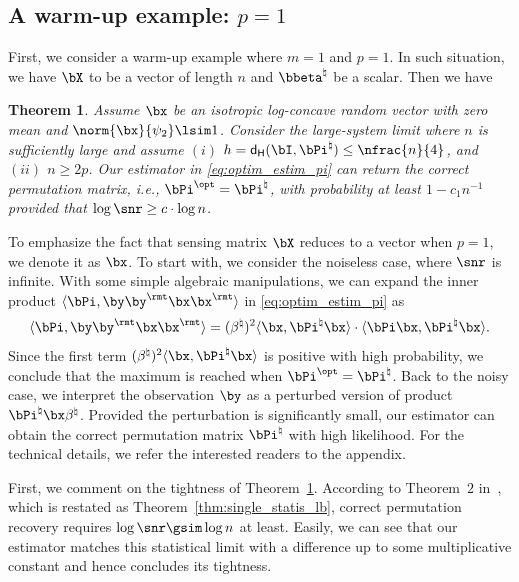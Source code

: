 \documentclass[11pt]{article}
\newtheorem{theorem}{Theorem}
\newenvironment{proofoutline}
 {\renewcommand\qedsymbol{}\proof[Proof outline]}
 {\endproof}
\def \dH {\mathsf{d_H}}
\def \bPitrue {\bPi^{\natural}}
\def \bbetatrue {\bbeta^{\natural}}
\def \betatrue {\beta^{\natural}}
\def \bPiopt {\bPi^{\opt}}
\begin{document}
\subsection{A warm-up example: $p = 1$}
\label{subsec:warm_up}
First, we consider a warm-up example
where $m = 1$ and $p = 1$.
In such situation, we have $\bX$ to be a vector of length $n$
and $\bbetatrue$ be a scalar. Then we have
\vsp


\begin{theorem}
\label{thm:warm_up}
Assume $\bx$ be an isotropic log-concave random vector
with zero mean and $\norm{\bx}{\psi_2} \lsim 1$.
Consider the large-system limit where $n$ is sufficiently
large and assume
$(i)$ $h = \dH(\bI, \bPitrue) \leq \nfrac{n}{4}$,
and $(ii)$ $n\geq 2p$.
Our estimator in \eqref{eq:optim_estim_pi}
can return the correct
permutation matrix, i.e., $\bPiopt = \bPitrue$,
with probability at least $1-c_1 n^{-1}$
provided that
$\log \snr \geq c\cdot \log n$.
\end{theorem}

\begin{proofoutline}
To emphasize the fact that sensing matrix
$\bX$ reduces to a vector when $p = 1$, we denote it as $\bx$.
To start with, we consider the noiseless case, where
$\snr$ is infinite.
With some simple algebraic manipulations, we can
expand the inner product
$\langle \bPi, \by\by^{\rmt}\bx\bx^{\rmt}\rangle$
in \eqref{eq:optim_estim_pi} as
\begin{align}
\label{eq:warm_up_noiseless_expand}
\langle \bPi, \by\by^{\rmt}\bx\bx^{\rmt} \rangle =
(\betatrue)^2 \langle \bx, \bPitrue\bx\rangle \cdot \langle \bPi\bx, \bPitrue\bx\rangle.
\end{align}
Since the first term $(\betatrue)^2 \langle \bx, \bPitrue\bx\rangle$
is positive with high probability, we conclude that
the maximum is reached when $\bPiopt = \bPitrue$.
Back to the noisy case,
we interpret the observation $\by$ as
a perturbed version of product $\bPitrue\bx\betatrue$. Provided
the perturbation is significantly small,
our estimator can obtain the correct permutation
matrix $\bPitrue$ with high likelihood.
For the technical details, we refer
the interested readers to the appendix.
\end{proofoutline}

First, we comment on the tightness of Theorem~\ref{thm:warm_up}.
According to Theorem~$2$ in~\citet{pananjady2018linear},
which is restated as Theorem~\ref{thm:single_statis_lb},
correct permutation recovery
requires $\log \snr\gsim \log n$ at least.
Easily, we can see that our estimator matches this statistical limit with a difference up to some multiplicative constant and hence concludes its tightness.
\end{document}
